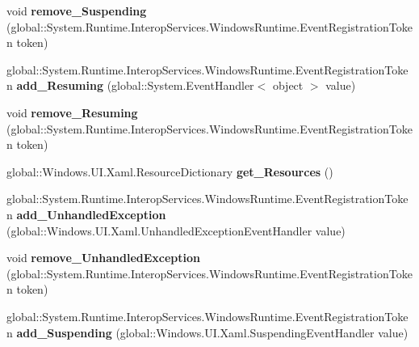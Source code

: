 \begin{DoxyCompactItemize}
void {\bfseries remove\+\_\+\+Suspending} (global\+::\+System.\+Runtime.\+Interop\+Services.\+Windows\+Runtime.\+Event\+Registration\+Token token)
\item 
\mbox{\label{interface_windows_1_1_u_i_1_1_xaml_1_1_i_application_adad8e0f1037225acc55bfcc1272edcd4}} 
global\+::\+System.\+Runtime.\+Interop\+Services.\+Windows\+Runtime.\+Event\+Registration\+Token {\bfseries add\+\_\+\+Resuming} (global\+::\+System.\+Event\+Handler$<$ object $>$ value)
\item 
\mbox{\label{interface_windows_1_1_u_i_1_1_xaml_1_1_i_application_a3388b85af6dfd9f47abf5dbfe7274acb}} 
void {\bfseries remove\+\_\+\+Resuming} (global\+::\+System.\+Runtime.\+Interop\+Services.\+Windows\+Runtime.\+Event\+Registration\+Token token)
\item 
\mbox{\label{interface_windows_1_1_u_i_1_1_xaml_1_1_i_application_af85326d17430aa8cf53216ec4beb0251}} 
global\+::\+Windows.\+U\+I.\+Xaml.\+Resource\+Dictionary {\bfseries get\+\_\+\+Resources} ()
\item 
\mbox{\label{interface_windows_1_1_u_i_1_1_xaml_1_1_i_application_ae4f5867a120030fd6bfe6cf03786a52d}} 
global\+::\+System.\+Runtime.\+Interop\+Services.\+Windows\+Runtime.\+Event\+Registration\+Token {\bfseries add\+\_\+\+Unhandled\+Exception} (global\+::\+Windows.\+U\+I.\+Xaml.\+Unhandled\+Exception\+Event\+Handler value)
\item 
\mbox{\label{interface_windows_1_1_u_i_1_1_xaml_1_1_i_application_ab5826c25b60c9dc3ea4c0dff5937ea55}} 
void {\bfseries remove\+\_\+\+Unhandled\+Exception} (global\+::\+System.\+Runtime.\+Interop\+Services.\+Windows\+Runtime.\+Event\+Registration\+Token token)
\item 
\mbox{\label{interface_windows_1_1_u_i_1_1_xaml_1_1_i_application_ac0c225619b2deaf238efa786fac50afb}} 
global\+::\+System.\+Runtime.\+Interop\+Services.\+Windows\+Runtime.\+Event\+Registration\+Token {\bfseries add\+\_\+\+Suspending} (global\+::\+Windows.\+U\+I.\+Xaml.\+Suspending\+Event\+Handler value)

\end{DoxyCompactItemize}
